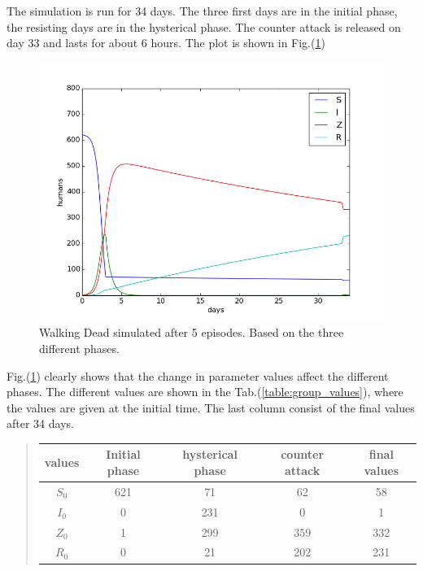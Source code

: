 \documentclass[%
twoside,                 %
final,                   %
chapterprefix=true,      %
open=right               %
10pt]{book}
\begin{document}
\noindent
The simulation is run for 34 days. The three first days are in the initial phase, the resisting days are in the hysterical phase. The counter attack is released on day 33 and lasts for about 6 hours. The plot is shown in Fig.(\ref{fig:all_phases})   


\begin{figure}[ht]
  \centerline{\includegraphics[width=0.9\linewidth]{1_fig/WD_zombie_all_phases_1.png}}
  \caption{
  \label{fig:all_phases} Walking Dead simulated after 5 episodes. Based on the three different phases.
  }
\end{figure}


Fig.(\ref{fig:all_phases}) clearly shows that the change in parameter values affect the different phases. The different values are shown in the Tab.(\ref{table:group_values}), where the values are given at the initial time. The last column consist of the final values after 34 days.

\label{table:group_values}

\begin{quote}
\begin{tabular}{ccccc}
\hline
\multicolumn{1}{c}{ values } & \multicolumn{1}{c}{ Initial phase } & \multicolumn{1}{c}{ hysterical phase } & \multicolumn{1}{c}{ counter attack } & \multicolumn{1}{c}{ final values } \\
\hline
$S_0$  & 621           & 71               & 62             & 58           \\
$I_0$  & 0             & 231              & 0              & 1            \\
$Z_0$  & 1             & 299              & 359            & 332          \\
$R_0$  & 0             & 21               & 202            & 231          \\
\hline
\end{tabular}
\end{quote}
\end{document}

